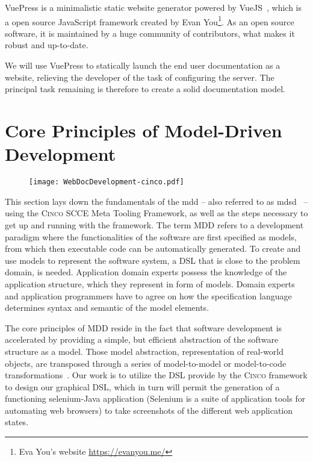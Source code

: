 VuePress is a minimalistic static website generator powered by VueJS~\cite{vuepress}, which is a open source JavaScript framework created by Evan You\footnote{Eva You's website \url{https://evanyou.me/}}. As an open source software, it is maintained by a huge community of contributors, what makes it robust and up-to-date.

We will use VuePress to statically launch the end user documentation as a website, relieving the developer of the task of configuring the server. The principal task remaining is therefore to create a solid documentation model.

\section{Core Principles of Model-Driven Development}

\begin{figure}[h]
    \centering
    \texttt{[image: WebDocDevelopment-cinco.pdf]}
    \label{fig:corePrincMDD}
\end{figure}

This section lays down the fundamentals of the \gls{mdd} -- also referred to as \gls{mdsd}~\cite{fowler} --  using the \textsc{Cinco} SCCE Meta Tooling Framework, as well as the steps necessary to get up and running with the framework. The term MDD refers to a development paradigm where the functionalities of the software are first specified as models, from which then executable code can be automatically generated. To create and use models to represent the software system, a DSL that is close to the problem domain, is needed. Application domain experts possess the knowledge of the application structure, which they represent in form of models. Domain experts and application programmers have to agree on how the specification language determines syntax and semantic of the model elements.

The core principles of MDD reside in the fact that software development is accelerated by providing a simple, but efficient abstraction of the software structure as a model. Those model abstraction, representation of real-world objects, are transposed through a series of model-to-model or model-to-code transformations~\cite{stahl_et_al}. Our work is to utilize the DSL provide by the \textsc{Cinco} framework to design our graphical DSL, which in turn will permit the generation of a functioning \gls*{selenium}-Java application (Selenium is a suite of application tools for automating web browsers) to take screenshots of the different web application states.

